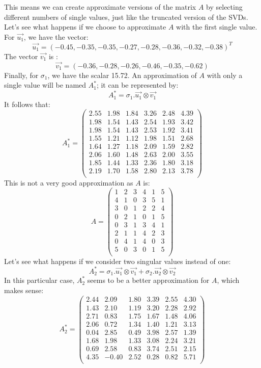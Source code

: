 \documentclass[600paper, 11pt,twoside,openany]{kdp}
\begin{document}
This means we can create approximate versions of the matrix $A$ by selecting different numbers of single values, just like the truncated version of the SVDs. Let’s see what happens if we choose to approximate $A$ with the first single value. For $\overrightarrow{u_1}$, we have the vector:
\[ \overrightarrow{u_1} = (-0.45, -0.35, -0.35, -0.27, -0.28, -0.36, -0.32, -0.38 )^T \]
The vector $\overrightarrow{v_1}$ is :
\[\overrightarrow{v_1} = (-0.36, -0.28, -0.26, -0.46, -0.35, -0.62 )\]
 \indent Finally, for $\sigma_1$, we have the scalar 15.72. An approximation of $A$ with only a single value will be named $A_1^*$; it can be represented by:
\[A^*_1 = \sigma_1.\overrightarrow{u_1} \otimes \overrightarrow{v_1}\]
\indent It follows that:
\[A^*_1 = \begin{pmatrix}
2.55 &  1.98 & 1.84 &  3.26 &  2.48 & 4.39 \\
1.98 & 1.54 & 1.43 & 2.54 & 1.93 & 3.42 \\
1.98 & 1.54 & 1.43 & 2.53 &  1.92 & 3.41 \\
1.55 & 1.21 & 1.12 & 1.98 & 1.51 & 2.68 \\
1.64 & 1.27 & 1.18 & 2.09 & 1.59 & 2.82 \\
2.06 & 1.60 & 1.48 & 2.63 &  2.00 & 3.55 \\
1.85 & 1.44 & 1.33 & 2.36 & 1.80 & 3.18 \\
2.19 & 1.70 & 1.58 & 2.80 & 2.13 & 3.78 \\
\end{pmatrix}
\]
\indent This is not a very good approximation as $A$ is:
\[A = \begin{pmatrix}
1 & 2 & 3 & 4 & 1 & 5\\
4 & 1 & 0 & 3 & 5 & 1\\
3 & 0 & 1 & 2 & 2 & 4\\
0 & 2 & 1 & 0 & 1 & 5\\
0 & 3 & 1 & 3 & 4 & 1\\
2 & 1 & 1 & 4 & 2 & 3\\
0 & 4 & 1 & 4 & 0 & 3\\
 5 & 0 & 3 & 0 & 1 & 5\\
\end{pmatrix}
\]
\indent Let’s see what happens if we consider two singular values instead of one:
\[
A^*_2 = \sigma_1.\overrightarrow{u_1} \otimes \overrightarrow{v_1} +
\sigma_2.\overrightarrow{u_2} \otimes \overrightarrow{v_2}
\]
\indent In this particular case, $A^*_2$ seems to be a better approximation for $A$, which makes sense:
\[A^*_2 = 
\begin{pmatrix}
2.44 & 2.09 & 1.80  & 3.39 & 2.55 & 4.30\\
1.43 & 2.10 &  1.19 & 3.20 & 2.28 & 2.92\\
2.71 & 0.83 & 1.75  & 1.67 & 1.48 & 4.06\\
2.06 & 0.72 & 1.34  & 1.40 & 1.21 & 3.13\\
0.04 & 2.85 & 0.49  & 3.98 & 2.57 & 1.39\\
1.68 & 1.98 & 1.33  & 3.08 & 2.24 & 3.21\\
0.69 & 2.58 & 0.83  & 3.74 & 2.51 & 2.15\\
4.35 & -0.40 & 2.52 & 0.28 & 0.82 & 5.71\\
\end{pmatrix}
\]
\end{document}
